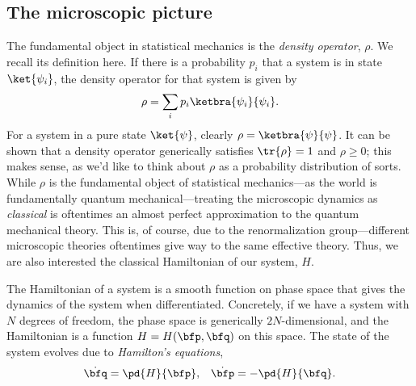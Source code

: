 \documentclass[11pt]{article}
\begin{document}
\subsection{The microscopic picture}





The fundamental object in statistical mechanics is the \emph{density operator},
$\rho$. We recall its definition here. If there is a probability $p_i$ that
a system is in state $\ket{\psi_i}$, the density operator for that system
is given by 
\begin{align*}
    \rho = \sum_i p_i \ketbra{\psi_i}{\psi_i}.
\end{align*}
For a system in a pure state $\ket{\psi}$, clearly $\rho = \ketbra{\psi}{\psi}$.
It can be shown that a density operator generically satisfies $\tr{\rho} = 1$
and $\rho \geq 0$; this makes sense, as we'd like to think about $\rho$ as
a probability distribution of sorts. While $\rho$ is the fundamental object
of statistical mechanics---as the world is fundamentally quantum mechanical---treating
the microscopic dynamics as \emph{classical} is oftentimes an almost
perfect approximation to the quantum mechanical theory. This is, of course,
due to the renormalization group---different microscopic theories oftentimes
give way to the same effective theory. Thus, we are also interested
the classical Hamiltonian of our system, $H$.

The Hamiltonian of a system is a smooth function on phase space that gives the
dynamics of the system when differentiated. Concretely, if we have a system with 
$N$ degrees of freedom, the phase space is generically $2N$-dimensional, and the Hamiltonian
is a function $H = H(\bfp, \bfq)$ on this space. The state of the system
evolves due to \emph{Hamilton's equations},
\begin{align*}
    & \dot{\bfq} = \pd{H}{\bfp},
    & \dot{\bfp} = - \pd{H}{\bfq}.
\end{align*}
\end{document}
